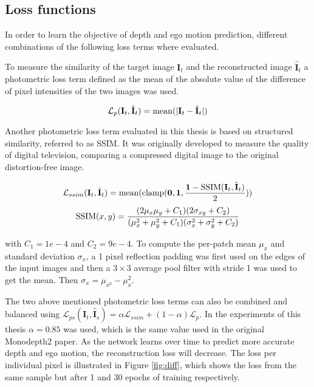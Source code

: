 

\subsection{Loss functions}
\label{sec:loss}

In order to learn the objective of depth and ego motion prediction, different combinations of the following loss terms where evaluated.

To measure the similarity of the target image $\textbf{I}_t$ and the reconstructed image $\hat{\textbf{I}}_t$ a photometric loss term defined as the mean of the absolute value of the difference of pixel intensities of the two images was used.

\begin{equation}
\mathcal{L}_p(\textbf{I}_t, \hat{\textbf{I}}_t)=\operatorname{mean}(|\textbf{I}_t - \hat{\textbf{I}}_t|)
\end{equation}

Another photometric loss term evaluated in this thesis is based on structured similarity, referred to as SSIM\cite{ssim}. It was originally developed to measure the quality of digital television, comparing a compressed digital image to the original distortion-free image.

\begin{equation}
\mathcal{L}_{ssim}(\textbf{I}_t, \hat{\textbf{I}}_t)=\operatorname{mean}(\operatorname{clamp}(\textbf{0},\textbf{1},\dfrac{\textbf{1}-\operatorname{SSIM}(\textbf{I}_t, \hat{\textbf{I}}_t)}{2}))
\end{equation}
\begin{equation}
\operatorname{SSIM}(x,y)=\frac{(2\mu_x\mu_y+C_1)(2\sigma_{xy}+C_2)}{(\mu_x^2+\mu_y^2+C_1)(\sigma_x^2+\sigma_y^2+C_2)}
\end{equation}

with $C_1=1e-4$ and $C_2=9e-4$. To compute the per-patch mean $\mu_x$ and standard deviation $\sigma_x$, a 1 pixel reflection padding was first used on the edges of the input images and then a $3\times3$ average pool filter with stride 1 was used to get the mean. Then $ \sigma_x=\mu_{x^2}-\mu_x^2 $.

The two above mentioned photometric loss terms can also be combined and balanced using $ \mathcal{L}_{ps}(\textbf{I}_t, \hat{\textbf{I}}_s) = \alpha \mathcal{L}_{ssim} + (1-\alpha) \mathcal{L}_p $. In the experiments of this thesis $\alpha=0.85$ was used, which is the same value used in the original Monodepth2 paper. As the network learns over time to predict more accurate depth and ego motion, the reconstruction loss will decrease. The loss per individual pixel is illustrated in Figure \ref{fig:diff}, which shows the loss from the same sample but after 1 and 30 epochs of training respectively.

